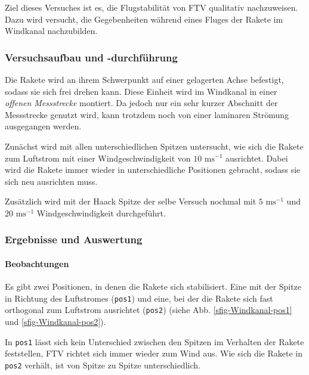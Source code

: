 \documentclass[10pt,a4paper]{article}
\begin{document}
Ziel dieses Versuches ist es, die Flugstabilität von FTV qualitativ nachzuweisen. Dazu wird versucht, die Gegebenheiten während eines Fluges der Rakete im Windkanal nachzubilden. 


\subsubsection{Versuchsaufbau und -durchführung}

Die Rakete wird an ihrem Schwerpunkt auf einer gelagerten Achse befestigt, sodass sie sich frei drehen kann. Diese Einheit wird im Windkanal in einer \textit{offenen Messstrecke} montiert. Da jedoch nur ein sehr kurzer Abschnitt der Messstrecke genutzt wird, kann trotzdem noch von einer laminaren Strömung ausgegangen werden.

Zunächst wird mit allen unterschiedlichen Spitzen untersucht, wie sich die Rakete zum Luftstrom mit einer Windgeschwindigkeit von $10 \text{ ms}^{-1}$ ausrichtet. Dabei wird die Rakete immer wieder in unterschiedliche Positionen gebracht, sodass sie sich neu ausrichten muss.

Zusätzlich wird mit der Haack Spitze der selbe Versuch nochmal mit $5 \text{ ms}^{-1}$ und $20 \text{ ms}^{-1}$ Windgeschwindigkeit durchgeführt. 


\subsubsection{Ergebnisse und Auswertung}

\paragraph{Beobachtungen}
Es gibt zwei Positionen, in denen die Rakete sich stabilisiert. Eine mit der Spitze in Richtung des Luftstromes (\texttt{pos1}) und eine, bei der die Rakete sich fast orthogonal zum Luftstrom ausrichtet (\texttt{pos2}) (siehe Abb. \ref{sfig-Windkanal-pos1} und \ref{sfig-Windkanal-pos2}).

In \texttt{pos1} lässt sich kein Unterschied zwischen den Spitzen im Verhalten der Rakete feststellen, FTV richtet sich immer wieder zum Wind aus. Wie sich die Rakete in \texttt{pos2} verhält, ist von Spitze zu Spitze unterschiedlich.
\end{document}
